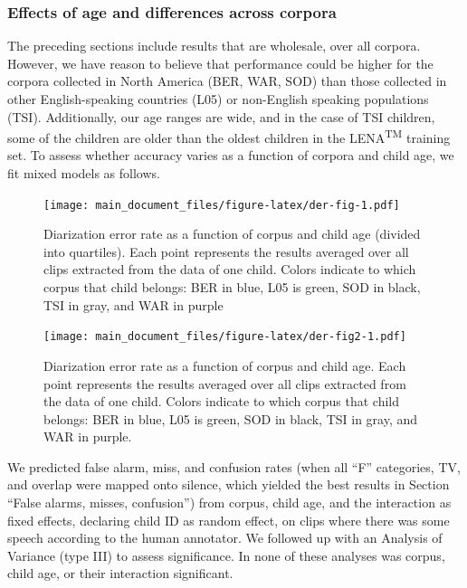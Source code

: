 \documentclass[english,table,man,floatsintext]{apa6}
\begin{document}
\hypertarget{effects-of-age-and-differences-across-corpora}{%
\subsubsection{Effects of age and differences across corpora}\label{effects-of-age-and-differences-across-corpora}}

The preceding sections include results that are wholesale, over all corpora. However, we have reason to believe that performance could be higher for the corpora collected in North America (BER, WAR, SOD) than those collected in other English-speaking countries (L05) or non-English speaking populations (TSI). Additionally, our age ranges are wide, and in the case of TSI children, some of the children are older than the oldest children in the LENA\textsuperscript{TM} training set. To assess whether accuracy varies as a function of corpora and child age, we fit mixed models as follows.

\begin{figure}
\centering
\texttt{[image: main\_document\_files/figure-latex/der-fig-1.pdf]}
\caption{\label{fig:der-fig}Diarization error rate as a function of corpus and child age (divided into quartiles). Each point represents the results averaged over all clips extracted from the data of one child. Colors indicate to which corpus that child belongs: BER in blue, L05 is green, SOD in black, TSI in gray, and WAR in purple}
\end{figure}

\begin{figure}
\centering
\texttt{[image: main\_document\_files/figure-latex/der-fig2-1.pdf]}
\caption{\label{fig:der-fig2}Diarization error rate as a function of corpus and child age. Each point represents the results averaged over all clips extracted from the data of one child. Colors indicate to which corpus that child belongs: BER in blue, L05 is green, SOD in black, TSI in gray, and WAR in purple.}
\end{figure}

We predicted false alarm, miss, and confusion rates (when all \enquote{F} categories, TV, and overlap were mapped onto silence, which yielded the best results in Section \enquote{False alarms, misses, confusion}) from corpus, child age, and the interaction as fixed effects, declaring child ID as random effect, on clips where there was some speech according to the human annotator. We followed up with an Analysis of Variance (type III) to assess significance. In none of these analyses was corpus, child age, or their interaction significant.
\end{document}
